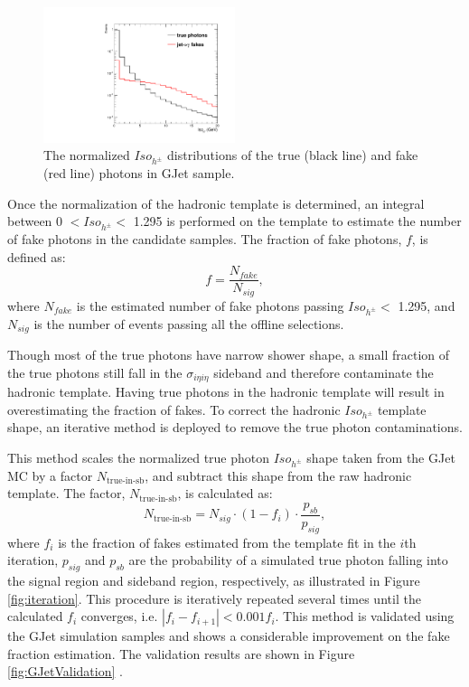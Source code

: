 \documentclass[thesis.tex]{subfiles}
\renewcommand\_{\textunderscore\allowbreak}
\begin{document}
\begin{figure}[hbt]
  \centering
    \includegraphics[width=0.5\textwidth]{Figures/PLOT_JetPhoTemplate.pdf}
  \caption{The normalized $Iso_{h^\pm}$ distributions of the true (black line) and fake (red line) photons in GJet sample.}
    \label{fig:fakeinGJet}
\end{figure}

Once the normalization of the hadronic template is determined, an integral between 0 $< Iso_{h^\pm} <$ 1.295 is performed on the template to estimate the number of fake photons in the candidate samples. The fraction of fake photons, $f$, is defined as: 
\begin{equation}
		f = \frac{N_{fake}}{N_{sig}},
\end{equation}
where $N_{fake}$ is the estimated number of fake photons passing $Iso_{h^\pm} < $ 1.295, and $N_{sig}$ is the number of events passing all the offline selections. 

Though most of the true photons have narrow shower shape, a small fraction of the true photons still fall in the $\sigma_{i\eta i\eta}$ sideband and therefore contaminate the hadronic template. Having true photons in the hadronic template will result in overestimating the fraction of fakes. To correct the hadronic $Iso_{h^\pm}$ template shape, an iterative method is deployed to remove the true photon contaminations.

This method scales the normalized true photon $Iso_{h^\pm}$ shape taken from the GJet MC by a factor $N_\textrm{true-in-sb}$, and subtract this shape from the raw hadronic template. The factor, $N_\textrm{true-in-sb}$,  is calculated as:
\begin{equation}
		N_\textrm{true-in-sb} = N_{sig} \cdot (1-f_i) \cdot \frac{p_{sb}}{p_{sig}},
\end{equation}
where $f_i$ is the fraction of fakes estimated from the template fit in the $i$th iteration, $p_{sig}$ and $p_{sb}$ are the probability of a simulated true photon falling into the signal region and sideband region, respectively, as illustrated in Figure \ref{fig:iteration}. This procedure is iteratively repeated several times until the calculated $f_i$ converges, i.e. $|f_i - f_{i+1}| < 0.001f_i$. This method is validated using the GJet simulation samples and shows a considerable improvement on the fake fraction estimation. The validation results are shown in Figure \ref{fig:GJetValidation} .
\end{document}
